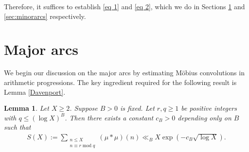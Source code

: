 \documentclass[11pt]{amsart}
\numberwithin{equation}{section}
\numberwithin{figure}{section}
\newtheorem{lemma}{Lemma}[section]
\theoremstyle{definition}
\newcommand{\modu}{\operatorname{mod}}
\begin{document}
Therefore, it suffices to establish \eqref{eq 1} and \eqref{eq 2}, which we do in Sections \ref{sec:nonprincipal} and \ref{sec:minorarcs} respectively.

\section{Major arcs} \label{sec:nonprincipal}
We begin our discussion on the major arcs by estimating M\"{o}bius convolutions in arithmetic progressions. The key ingredient required for the following result is Lemma \ref{Davenport}.
\begin{lemma}\label{Davenport Lemma for Convolutions}
Let $X \geqslant 2$. Suppose $B>0$ is fixed. Let $r, q\geqslant 1$ be positive integers with $q\leqslant(\log X)^B$. Then there exists a constant $c_B>0$ depending only on $B$ such that
\begin{align*}
    S(X) := \sum_{\substack{n \leqslant X \\ n \equiv r \modu q}} (\mu * \mu)(n) \ll_B X\exp(-c_B\sqrt{\log X}).
\end{align*}
\end{lemma}
\end{document}
